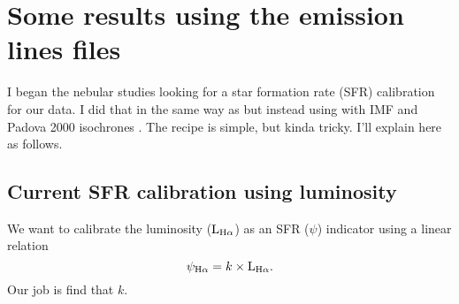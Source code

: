 \documentclass[a4paper,11pt]{article}
\begin{document}
\section{Some results using the emission lines files}

I began the nebular studies looking for a star formation rate (SFR) calibration for our data. I did that in the same way as \citet[sec. 5.1]{Asari.etal.2007a} but instead using \citet{BC03a} with \citet{Salpeter.1955a} IMF and Padova 2000 isochrones \citep{Girardi.etal.2000a}. The recipe is simple, but kinda tricky. I'll explain here as follows.

\subsection{Current SFR calibration using \Halpha luminosity}
\label{sub:NebularSFR}
We want to calibrate the \Halpha luminosity ($\mathrm{L}_{\Halpha}$) as an SFR ($\psi$) indicator \citep[e.g., ][]{Kennicutt.1998a} using a linear relation
\begin{equation}
	\psi_{\Halpha} = k \times \mathrm{L}_{\Halpha}.
	\label{eq:SFRHa}
\end{equation}
\noindent Our job is find that $k$.
\end{document}
